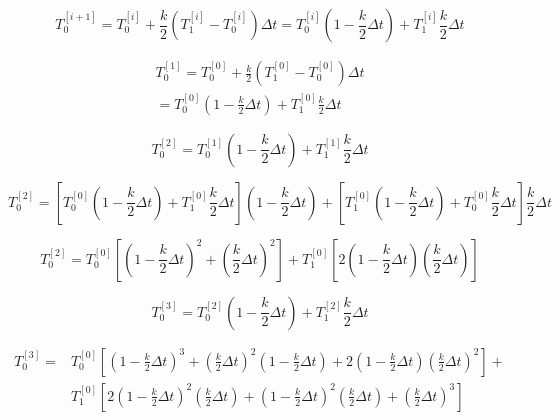 \documentclass{article}
\begin{document}
\begin{equation}
    T_0^{[i+1]} = T_0^{[i]}+\frac{k}{2}(T_1^{[i]}-T_0^{[i]})\Delta t = T_0^{[i]}\left(1-\frac{k}{2}\Delta t\right)+T_1^{[i]}\frac{k}{2}\Delta t 
\end{equation}

\begin{equation}
\begin{split}
    T_0^{[1]} = T_0^{[0]}+\frac{k}{2}(T_1^{[0]}-T_0^{[0]})\Delta t \\ = T_0^{[0]}\left(1-\frac{k}{2}\Delta t\right)+T_1^{[0]}\frac{k}{2}\Delta t 
\end{split}
\end{equation}

\begin{equation*}
    T_0^{[2]} =  T_0^{[1]}\left(1-\frac{k}{2}\Delta t\right)+T_1^{[1]}\frac{k}{2}\Delta t 
\end{equation*}

\begin{equation*}
    T_0^{[2]} =  \left[T_0^{[0]}\left(1-\frac{k}{2}\Delta t\right)+T_1^{[0]}\frac{k}{2}\Delta t\right]\left(1-\frac{k}{2}\Delta t\right)+\left[T_1^{[0]}\left(1-\frac{k}{2}\Delta t\right)+T_0^{[0]}\frac{k}{2}\Delta t\right]\frac{k}{2}\Delta t
\end{equation*}

\begin{equation}
    T_0^{[2]} =  T_0^{[0]}\left[\left(1-\frac{k}{2}\Delta t\right)^2+\left(\frac{k}{2}\Delta t\right)^2\right]+T_1^{[0]}\left[2\left(1-\frac{k}{2}\Delta t\right)\left(\frac{k}{2}\Delta t\right)\right]
\end{equation}

\begin{equation*}
    T_0^{[3]} =  T_0^{[2]}\left(1-\frac{k}{2}\Delta t\right)+T_1^{[2]}\frac{k}{2}\Delta t 
\end{equation*}

\begin{equation*}
\begin{split}
    T_0^{[3]} = & T_0^{[0]}\left[\left(1-\frac{k}{2}\Delta t\right)^3+\left(\frac{k}{2}\Delta t\right)^2\left(1-\frac{k}{2}\Delta t\right)+2\left(1-\frac{k}{2}\Delta t\right)\left(\frac{k}{2}\Delta t\right)^2\right] + \\ & T_1^{[0]}\left[2\left(1-\frac{k}{2}\Delta t\right)^2\left(\frac{k}{2}\Delta t\right)+\left(1-\frac{k}{2}\Delta t\right)^2\left(\frac{k}{2}\Delta t\right)+\left(\frac{k}{2}\Delta t\right)^3\right]
\end{split}
\end{equation*}
\end{document}
